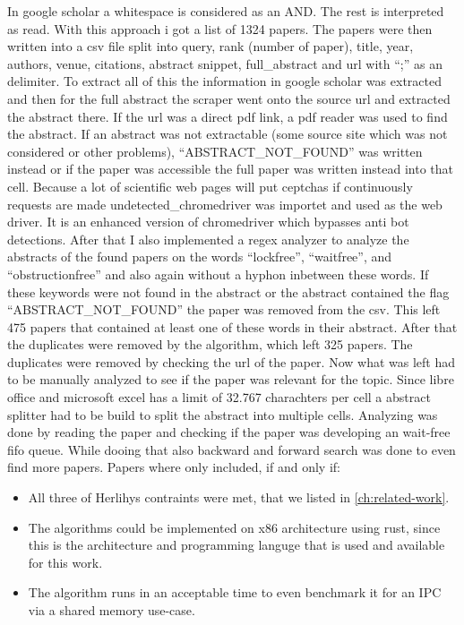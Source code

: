 In google scholar a whitespace is considered as an AND. The rest is interpreted as read. With this approach i got a list of 1324 papers. The papers were then written into a csv file split into query, rank (number of paper), title, year, authors, venue, citations, abstract snippet, full\_abstract and url with \enquote{;} as an delimiter. To extract all of this the information in google scholar was extracted and then for the full abstract the scraper went onto the source url and extracted the abstract there. If the url was a direct pdf link, a pdf reader was used to find the abstract. If an abstract was not extractable (some source site which was not considered or other problems), \enquote{ABSTRACT\_NOT\_FOUND} was written instead or if the paper was accessible the full paper was written instead into that cell. Because a lot of scientific web pages will put ceptchas if continuously requests are made undetected\_chromedriver was importet and used as the web driver. It is an enhanced version of chromedriver which bypasses anti bot detections. After that I also implemented a regex analyzer to analyze the abstracts of the found papers on the words \enquote{lock\-free}, \enquote{wait\-free}, and \enquote{obstruction\-free} and also again without a hyphon inbetween these words. If these keywords were not found in the abstract or the abstract contained the flag \enquote{ABSTRACT\_NOT\_FOUND} the paper was removed from the csv. This left 475 papers that contained at least one of these words in their abstract. After that the duplicates were removed by the algorithm, which left 325 papers. The duplicates were removed by checking the url of the paper. Now what was left had to be manually analyzed to see if the paper was relevant for the topic. Since libre office and microsoft excel has a limit of 32.767 charachters per cell a abstract splitter had to be build to split the abstract into multiple cells. Analyzing was done by reading the paper and checking if the paper was developing an wait-free fifo queue. While dooing that also backward and forward search was done to even find more papers. Papers where only included, if and only if: 
\begin{itemize}
   \item All three of Herlihys contraints were met, that we listed in \cref{ch:related-work}.
   \item The algorithms could be implemented on x86 architecture using rust, since this is the architecture and programming languge that is used and available for this work.
   \item The algorithm runs in an acceptable time to even benchmark it for an \ac{IPC} via a shared memory use-case.
\end{itemize}
